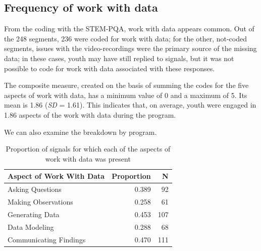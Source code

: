 \documentclass[]{book}
\theoremstyle{definition}
\theoremstyle{definition}
\theoremstyle{definition}
\theoremstyle{remark}
\begin{document}
\subsection{Frequency of work with
data}\label{frequency-of-work-with-data}

From the coding with the STEM-PQA, work with data appears common. Out of
the 248 segments, 236 were coded for work with data; for the other,
not-coded segments, issues with the video-recordings were the primary
source of the missing data; in these cases, youth may have still replied
to signals, but it was not possible to code for work with data
associated with these responses.

The composite measure, created on the basis of summing the codes for the
five aspects of work with data, has a minimum value of 0 and a maximum
of 5. Its mean is 1.86 (\emph{SD} = 1.61). This indicates that, on
average, youth were engaged in 1.86 aspects of the work with data during
the program.

We can also examine the breakdown by program.

\begin{table}

\caption{\label{tab:unnamed-chunk-9}Proportion of signals for which each of the aspects of work with data was present}
\centering
\begin{tabular}[t]{lrr}
\toprule
Aspect of Work With Data & Proportion & N\\
\midrule
Asking Questions & 0.389 & 92\\
Making Observations & 0.258 & 61\\
Generating Data & 0.453 & 107\\
Data Modeling & 0.288 & 68\\
Communicating Findings & 0.470 & 111\\
\bottomrule
\end{tabular}
\end{table}
\end{document}
